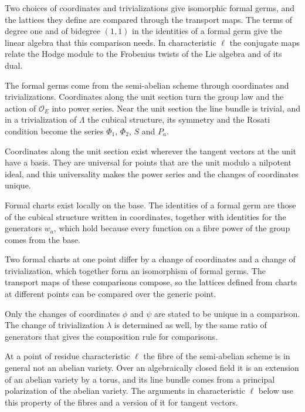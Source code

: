 Two choices of coordinates and trivializations give isomorphic formal germs, and the lattices they
define are compared through the transport maps. The terms of degree one and of bidegree $(1,1)$ in
the identities of a formal germ give the linear algebra that this comparison needs. In
characteristic $\ell$ the conjugate maps relate the Hodge module to the Frobenius twists of the Lie
algebra and of its dual.

The formal germs come from the semi-abelian scheme through coordinates and trivializations. Coordinates
along the unit section turn the group law and the action of $\mathcal O_E$ into power series. Near the
unit section the line bundle is trivial, and in a trivialization of $\Lambda$ the cubical structure, its
symmetry and the Rosati condition become the series $\Phi_1$, $\Phi_2$, $S$ and $P_a$.

Coordinates along the unit section exist wherever the tangent vectors at the unit have a basis. They
are universal for points that are the unit modulo a nilpotent ideal, and this universality makes the
power series and the changes of coordinates unique.

Formal charts exist locally on the base. The identities of a formal germ are those of the cubical
structure written in coordinates, together with identities for the generators $w_a$, which hold because
every function on a fibre power of the group comes from the base.

Two formal charts at one point differ by a change of coordinates and a change of trivialization, which
together form an isomorphism of formal germs. The transport maps of these comparisons compose, so the
lattices defined from charts at different points can be compared over the generic point.

Only the changes of coordinates $\phi$ and $\psi$ are stated to be unique in a comparison. The change of
trivialization $\lambda$ is determined as well, by the same ratio of generators that gives the composition
rule for comparisons.

At a point of residue characteristic $\ell$ the fibre of the semi-abelian scheme is in general not an
abelian variety. Over an algebraically closed field it is an extension of an abelian variety by a torus,
and its line bundle comes from a principal polarization of the abelian variety. The arguments in
characteristic $\ell$ below use this property of the fibres and a version of it for tangent vectors.

